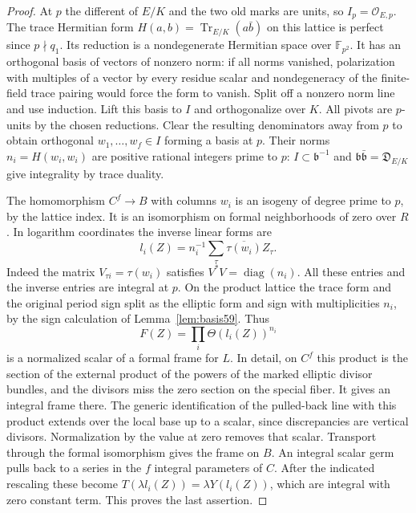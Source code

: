 \documentclass[a4paper,11pt]{article}
\theoremstyle{definition}
\theoremstyle{remark}
\numberwithin{equation}{section}
\begin{document}
\begin{proof}
At \(p\) the different of \(E/K\) and the two old marks are
units, so \(I_p=\mathcal O_{E,p}\). The trace Hermitian form
\(H(a,b)=\operatorname{Tr}_{E/K}(a\bar b)\) on this lattice
is perfect since \(p\nmid q_1\). Its reduction is a
nondegenerate Hermitian space over \(\mathbb F_{p^2}\).
It has an orthogonal basis of vectors of nonzero norm:
if all norms vanished, polarization with multiples of a
vector by every residue scalar and nondegeneracy of the
finite-field trace pairing would force the form to vanish.
Split off a nonzero norm line and use induction.
Lift this basis to \(I\) and orthogonalize over \(K\).
All pivots are \(p\)-units by the chosen reductions.
Clear the resulting denominators away from \(p\) to obtain
orthogonal \(w_1,\ldots,w_f\in I\) forming a basis at \(p\).
Their norms \(n_i=H(w_i,w_i)\) are positive rational integers
prime to \(p\): \(I\subset\mathfrak b^{-1}\) and
\(\mathfrak b\bar{\mathfrak b}=\mathfrak D_{E/K}\) give
integrality by trace duality.

The homomorphism \(C^f\to B\) with columns \(w_i\) is an
isogeny of degree prime to \(p\), by the lattice index.
It is an isomorphism on formal neighborhoods of zero over
\(R\). In logarithm coordinates the inverse linear forms are
\[
               l_i(Z)=n_i^{-1}\sum_{\tau}\overline{\tau(w_i)}Z_\tau.
\]
Indeed the matrix \(V_{\tau i}=\tau(w_i)\) satisfies
\(V^*V=\operatorname{diag}(n_i)\). All these entries and
the inverse entries are integral at \(p\). On the product
lattice the trace form and the original period sign split as
the elliptic form and sign with multiplicities \(n_i\), by
the sign calculation of Lemma~\ref{lem:basis59}. Thus
\[
                    F(Z)=\prod_i\Theta(l_i(Z))^{n_i}
\]
is a normalized scalar of a formal frame for \(L\). In detail,
on \(C^f\) this product is the section of the external
product of the powers of the marked elliptic divisor bundles,
and the divisors miss the zero section on the special fiber.
It gives an integral frame there. The generic identification
of the pulled-back line with this product extends over the
local base up to a scalar, since discrepancies are vertical
divisors. Normalization by the value at zero removes that
scalar. Transport through the formal isomorphism gives the
frame on \(B\). An integral scalar germ pulls back to a series
in the \(f\) integral parameters of \(C\). After the indicated
rescaling these become \(T(\lambda l_i(Z))=\lambda Y(l_i(Z))\),
which are integral with zero constant term. This proves the
last assertion.


\end{proof}
\end{document}
